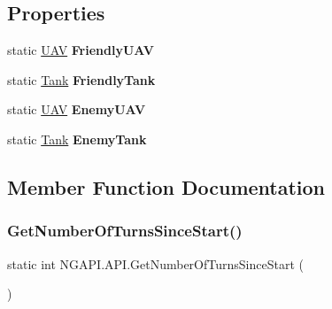 \subsection*{Properties}
\begin{DoxyCompactItemize}
\item 
\mbox{\label{class_n_g_a_p_i_1_1_a_p_i_a296d43a007da5ce44a5d853d1fdaa037}} 
static \hyperlink{class_n_g_a_p_i_1_1_u_a_v}{U\+AV} {\bfseries Friendly\+U\+AV}
\item 
\mbox{\label{class_n_g_a_p_i_1_1_a_p_i_aa6bd6518b377af427ff2bd9f43b5935a}} 
static \hyperlink{class_n_g_a_p_i_1_1_tank}{Tank} {\bfseries Friendly\+Tank}
\item 
\mbox{\label{class_n_g_a_p_i_1_1_a_p_i_a94df546e54d160610f45d5a46ba1dab7}} 
static \hyperlink{class_n_g_a_p_i_1_1_u_a_v}{U\+AV} {\bfseries Enemy\+U\+AV}
\item 
\mbox{\label{class_n_g_a_p_i_1_1_a_p_i_af4ec3821fab1a50e0197e44874bf7660}} 
static \hyperlink{class_n_g_a_p_i_1_1_tank}{Tank} {\bfseries Enemy\+Tank}
\end{DoxyCompactItemize}


\subsection{Member Function Documentation}
\mbox{\label{class_n_g_a_p_i_1_1_a_p_i_a541c8a9511350ce4983690e6492a6221}} 
\subsubsection{\texorpdfstring{Get\+Number\+Of\+Turns\+Since\+Start()}{GetNumberOfTurnsSinceStart()}}
{\footnotesize\ttfamily static int N\+G\+A\+P\+I.\+A\+P\+I.\+Get\+Number\+Of\+Turns\+Since\+Start (\begin{DoxyParamCaption}{ }\end{DoxyParamCaption})\hspace{0.3cm}{\ttfamily [static]}}



